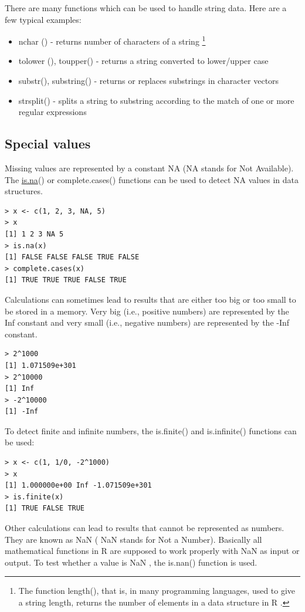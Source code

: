 \documentclass[11pt,openany,executivepaper]{book}
\begin{document}
There are many functions which can be used to handle string data. Here are a few typical examples:

\begin{itemize}
  \item nchar () - returns number of characters of a string \footnote{The function length(), that is, in many programming languages, used to give a string length, returns the number of elements in a data structure in R .}
  \item tolower (), toupper() - returns a string converted to lower/upper case
  \item substr(), substring() - returns or replaces substrings in character vectors
  \item strsplit() - splits a string to substring according to the match of one or more regular expressions
\end{itemize}

\subsection{Special values}
Missing values are represented by a constant NA (NA stands for Not Available). The \href{http://is.na}{is.na}() or complete.cases() functions can be used to detect NA values in data structures.

\begin{verbatim}
> x <- c(1, 2, 3, NA, 5)
> x
[1] 1 2 3 NA 5
> is.na(x)
[1] FALSE FALSE FALSE TRUE FALSE
> complete.cases(x)
[1] TRUE TRUE TRUE FALSE TRUE
\end{verbatim}

Calculations can sometimes lead to results that are either too big or too small to be stored in a memory. Very big (i.e., positive numbers) are represented by the Inf constant and very small (i.e., negative numbers) are represented by the -Inf constant.

\begin{verbatim}
> 2^1000
[1] 1.071509e+301
> 2^10000
[1] Inf
> -2^10000
[1] -Inf
\end{verbatim}

To detect finite and infinite numbers, the is.finite() and is.infinite() functions can be used:

\begin{verbatim}
> x <- c(1, 1/0, -2^1000)
> x
[1] 1.000000e+00 Inf -1.071509e+301
> is.finite(x)
[1] TRUE FALSE TRUE
\end{verbatim}

Other calculations can lead to results that cannot be represented as numbers. They are known as NaN ( NaN stands for Not a Number). Basically all mathematical functions in R are supposed to work properly with NaN as input or output. To test whether a value is NaN , the is.nan() function is used.
\end{document}

